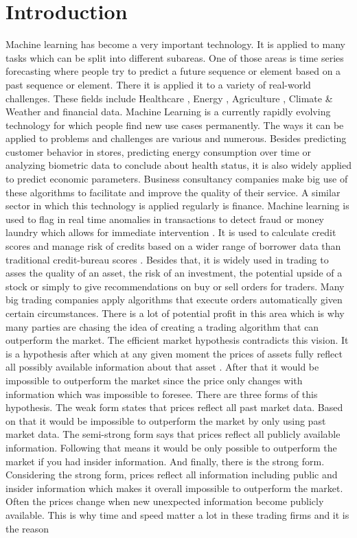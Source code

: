 \documentclass[a4paper,12pt]{report}
\begin{document}
\tableofcontents
\listoffigures
\newpage





\chapter{Introduction}
Machine learning has become a very important technology. It is applied to many tasks which can be split into different subareas. One of those areas is time series forecasting where people try to predict a future sequence or element based on a past sequence or element. There it is applied it to a variety of real-world challenges. These fields include Healthcare \cite{1}, Energy \cite{2}, Agriculture \cite{3}, Climate \& Weather \cite{4} and financial data. Machine Learning is a currently rapidly evolving technology for which people find new use cases permanently. The ways it can be applied to problems and challenges are various and numerous. Besides predicting customer behavior in stores, predicting energy consumption over time or analyzing biometric data to conclude about health status, it is also widely applied to predict economic parameters. Business consultancy companies make big use of these algorithms to facilitate and improve the quality of their service. A similar sector in which this technology is applied regularly is finance. Machine learning is used to flag in real time anomalies in transactions to detect fraud or money laundry which allows for immediate intervention \cite{58}. It is used to calculate credit scores and manage risk of credits based on a wider range of borrower data than traditional credit-bureau scores \cite{59}. Besides that, it is widely used in trading to asses the quality of an asset, the risk of an investment, the potential upside of a stock or simply to give recommendations on buy or sell orders for traders. Many big trading companies apply algorithms that execute orders automatically given certain circumstances. There is a lot of potential profit in this area which is why many parties are chasing the idea of creating a trading algorithm that can outperform the market. The efficient market hypothesis contradicts this vision. It is a hypothesis after which at any given moment the prices of assets fully reflect all possibly available information about that asset \cite{60}. After that it would be impossible to outperform the market since the price only changes with information which was impossible to foresee. There are three forms of this hypothesis. The weak form states that prices reflect all past market data. Based on that it would be impossible to outperform the market by only using past market data. The semi-strong form says that prices reflect all publicly available information. Following that means it would be only possible to outperform the market if you had insider information. And finally, there is the strong form. Considering the strong form, prices reflect all information including public and insider information which makes it overall impossible to outperform the market. Often the prices change when new unexpected information become publicly available. This is why time and speed matter a lot in these trading firms and it is the reason 
\end{document}
